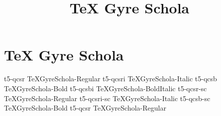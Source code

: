 \documentclass[sample]{vnsample}
\title{TeX Gyre Schola}
\begin{document}
\section{TeX Gyre Schola}
    {t5-qcsr}     {TeXGyreSchola-Regular}
   {t5-qcsri}    {TeXGyreSchola-Italic}
    {t5-qcsb}     {TeXGyreSchola-Bold}
   {t5-qcsbi}    {TeXGyreSchola-BoldItalic}
   {t5-qcsr-sc}  {TeXGyreSchola-Regular}
 {t5-qcsri-sc} {TeXGyreSchola-Italic}
   {t5-qcsb-sc}  {TeXGyreSchola-Bold}
    {t5-qcsr}     {TeXGyreSchola-Regular}
\end{document}
